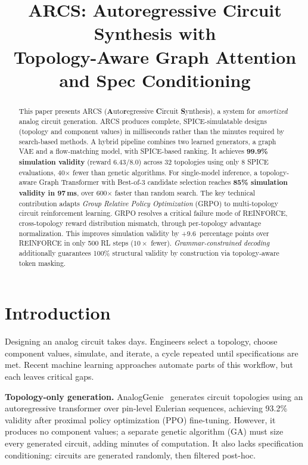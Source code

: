 \documentclass[conference]{IEEEtran}
\title{ARCS: Autoregressive Circuit Synthesis with\\
Topology-Aware Graph Attention and Spec Conditioning}
\author{
\IEEEauthorblockN{Tushar Dhananjay Pathak}
\IEEEauthorblockA{New York University\\
\texttt{tdp9953@nyu.edu}}
}
\begin{document}
\maketitle

\begin{abstract}
This paper presents ARCS (\textbf{A}uto\textbf{r}egressive
\textbf{C}ircuit \textbf{S}ynthesis), a system for \emph{amortized}
analog circuit generation. ARCS produces complete, SPICE-simulatable
designs (topology and component values) in milliseconds rather than
the minutes required by search-based methods. A hybrid pipeline
combines two learned generators, a graph VAE and a flow-matching
model, with SPICE-based ranking. It achieves \textbf{99.9\%
simulation validity} (reward 6.43/8.0) across 32 topologies using
only 8 SPICE evaluations, 40$\times$ fewer than genetic algorithms.
For single-model inference, a topology-aware Graph Transformer with
Best-of-3 candidate selection reaches \textbf{85\% simulation
validity in 97\,ms}, over 600$\times$ faster than random search. The
key technical contribution adapts \emph{Group Relative Policy
Optimization} (GRPO) to multi-topology circuit reinforcement
learning. GRPO resolves a critical failure mode of REINFORCE,
cross-topology reward distribution mismatch, through per-topology
advantage normalization. This improves simulation validity by
+9.6~percentage points over REINFORCE in only 500 RL steps ($10\times$
fewer). \emph{Grammar-constrained decoding} additionally guarantees
100\% structural validity by construction via topology-aware token
masking.
\end{abstract}

\section{Introduction}
\label{sec:intro}

Designing an analog circuit takes days. Engineers select a topology,
choose component values, simulate, and iterate, a cycle repeated
until specifications are met. Recent machine learning approaches
automate parts of this workflow, but each leaves critical gaps.

\textbf{Topology-only generation.} AnalogGenie~\cite{analoggenie}
generates circuit topologies using an autoregressive transformer over
pin-level Eulerian sequences, achieving 93.2\% validity after
proximal policy optimization (PPO) fine-tuning. However, it produces
no component values; a separate genetic algorithm (GA) must size
every generated circuit, adding minutes of computation. It also lacks specification conditioning: circuits are
generated randomly, then filtered post-hoc.
\end{document}
